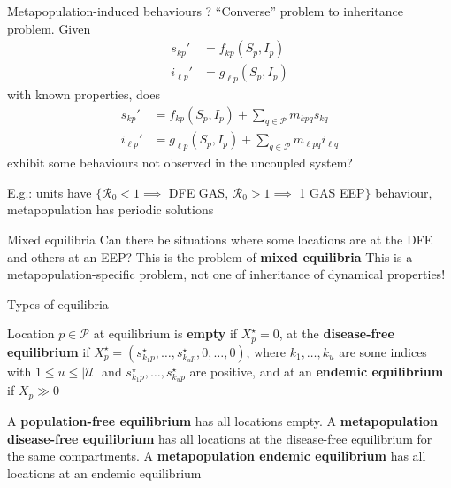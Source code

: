 \documentclass[aspectratio=169]{beamer}\usepackage[]{graphicx}\usepackage[]{xcolor}
\begin{document}
\begin{frame}{Metapopulation-induced behaviours ?}
	``Converse'' problem to inheritance problem. Given
	\begin{align}
	s_{kp}' &= f_{kp}(S_p,I_p)  \tag{9a} \\
	i_{\ell p}' &= g_{\ell p}(S_p,I_p) \tag{9b}
	\end{align}
	with known properties, does
	\begin{align}
	s_{kp}' &= f_{kp}(S_p,I_p)+\textstyle{\sum_{q\in\mathcal{P}}} m_{kpq}s_{kq}  \tag{10a} \\
	i_{\ell p}' &= g_{\ell p}(S_p,I_p)+\textstyle{\sum_{q\in\mathcal{P}}} m_{\ell pq}i_{\ell q}  \tag{10b}
	\end{align}
	exhibit some behaviours not observed in the uncoupled system?
	
	E.g.: units have $\{\mathcal{R}_0<1\implies$ DFE GAS, $\mathcal{R}_0>1\implies$ 1 GAS EEP$\}$ behaviour, metapopulation has periodic solutions
		
\end{frame}

\begin{frame}{Mixed equilibria}
	Can there be situations where some locations are at the DFE and others at an EEP?
	\vfill
	This is the problem of \textbf{mixed equilibria}
	\vfill
	This is a metapopulation-specific problem, not one of inheritance of dynamical properties!
\end{frame}

\begin{frame}{Types of equilibria}
	\begin{definition}
		Location $p\in\mathcal{P}$ at equilibrium is \textbf{empty} if $X_p^\star=0$, at the \textbf{disease-free equilibrium} if $X_p^\star=(s_{k_1p}^\star,\ldots,s_{k_up}^\star,0,\ldots,0)$, where $k_1,\ldots,k_u$ are some indices with $1\leq u\leq|\mathcal{U}|$ and $s_{k_1p}^\star,\ldots,s_{k_up}^\star$ are positive, and at an \textbf{endemic equilibrium} if $X_p\gg 0$
	\end{definition}
	\vfill
	\begin{definition}
		A \textbf{population-free equilibrium} has all locations empty. A \textbf{metapopulation disease-free equilibrium} has all locations at the disease-free equilibrium for the same compartments. A \textbf{metapopulation endemic equilibrium} has all locations at an endemic equilibrium
	\end{definition}
\end{frame}
\end{document}
